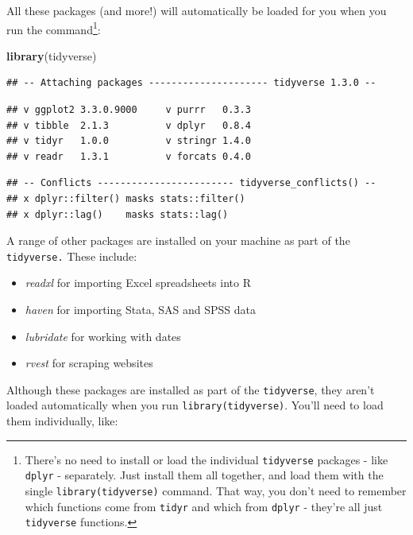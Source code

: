 \documentclass[]{book}
\newenvironment{Shaded}{\begin{snugshade}}{\end{snugshade}}
\newcommand{\KeywordTok}[1]{\textcolor[rgb]{0.13,0.29,0.53}{\textbf{#1}}}
\newcommand{\NormalTok}[1]{#1}
\providecommand{\tightlist}{%
  \setlength{\itemsep}{0pt}\setlength{\parskip}{0pt}}
\begin{document}
All these packages (and more!) will automatically be loaded for you when you run the command\footnote{There's no need to install or load the individual \texttt{tidyverse} packages - like \texttt{dplyr} - separately. Just install them all together, and load them with the single \texttt{library(tidyverse)} command. That way, you don't need to remember which functions come from \texttt{tidyr} and which from \texttt{dplyr} - they're all just \texttt{tidyverse} functions.}:

\begin{Shaded}
\begin{Highlighting}[]
\KeywordTok{library}\NormalTok{(tidyverse)}
\end{Highlighting}
\end{Shaded}

\begin{verbatim}
## -- Attaching packages --------------------- tidyverse 1.3.0 --
\end{verbatim}

\begin{verbatim}
## v ggplot2 3.3.0.9000     v purrr   0.3.3     
## v tibble  2.1.3          v dplyr   0.8.4     
## v tidyr   1.0.0          v stringr 1.4.0     
## v readr   1.3.1          v forcats 0.4.0
\end{verbatim}

\begin{verbatim}
## -- Conflicts ------------------------ tidyverse_conflicts() --
## x dplyr::filter() masks stats::filter()
## x dplyr::lag()    masks stats::lag()
\end{verbatim}

A range of other packages are installed on your machine as part of the \texttt{tidyverse.} These include:

\begin{itemize}
\tightlist
\item
  \emph{readxl} for importing Excel spreadsheets into R
\item
  \emph{haven} for importing Stata, SAS and SPSS data
\item
  \emph{lubridate} for working with dates
\item
  \emph{rvest} for scraping websites
\end{itemize}

Although these packages are installed as part of the \texttt{tidyverse}, they aren't loaded automatically when you run \texttt{library(tidyverse)}. You'll need to load them individually, like:
\end{document}
